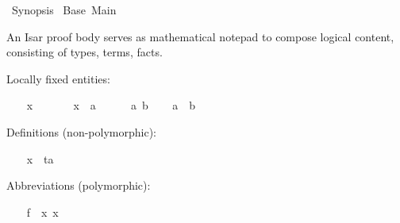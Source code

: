 %
\begin{isabellebody}%
\def\isabellecontext{Synopsis}%
%
\isadelimtheory
%
\endisadelimtheory
%
\isatagtheory
{}\isamarkupfalse%
\ Synopsis\isanewline
{}\ Base\ Main\isanewline
{}%
\endisatagtheory
{\isafoldtheory}%
%
\isadelimtheory
%
\endisadelimtheory
%
\isamarkuptrue%
%
\isamarkuptrue%
%
\begin{isamarkuptext}%
An Isar proof body serves as mathematical notepad to compose logical
  content, consisting of types, terms, facts.%
\end{isamarkuptext}%
\isamarkuptrue%
%
\isamarkuptrue%
\isamarkupfalse%
\isanewline
{}%
\isadelimproof
%
\endisadelimproof
%
\isatagproof
%
\begin{isamarkuptxt}%
Locally fixed entities:%
\end{isamarkuptxt}%
\isamarkuptrue%
\ \ \isamarkupfalse%
\ x\ \ \ %
\isanewline
\ \ \isamarkupfalse%
\ x\ {}{}\ {}a\ \ %
\isanewline
\isanewline
\ \ \isamarkupfalse%
\ a\ b\isanewline
\ \ \isamarkupfalse%
\ {}a\ {}\ b{}\ \ %
%
\begin{isamarkuptxt}%
Definitions (non-polymorphic):%
\end{isamarkuptxt}%
\isamarkuptrue%
\ \ \isamarkupfalse%
\ x\ {}\ {}t{}{}{}a{}%
\begin{isamarkuptxt}%
Abbreviations (polymorphic):%
\end{isamarkuptxt}%
\isamarkuptrue%
\ \ \isamarkupfalse%
\ {}f\ {}\ {}{}x{}\ x{}%

\end{isabellebody}
